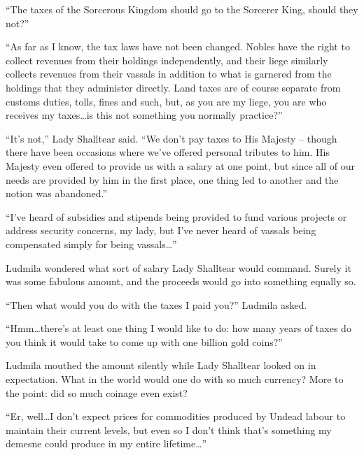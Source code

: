 

“The taxes of the Sorcerous Kingdom should go to the Sorcerer King, should they not?”

 

“As far as I know, the tax laws have not been changed. Nobles have the right to collect revenues from their holdings independently, and their liege similarly collects revenues from their vassals in addition to what is garnered from the holdings that they administer directly. Land taxes are of course separate from customs duties, tolls, fines and such, but, as you are my liege, you are who receives my taxes…is this not something you normally practice?”

 

“It’s not,” Lady Shalltear said. “We don’t pay taxes to His Majesty – though there have been occasions where we’ve offered personal tributes to him. His Majesty even offered to provide us with a salary at one point, but since all of our needs are provided by him in the first place, one thing led to another and the notion was abandoned.”

 

“I’ve heard of subsidies and stipends being provided to fund various projects or address security concerns, my lady, but I’ve never heard of vassals being compensated simply for being vassals…”

 

Ludmila wondered what sort of salary Lady Shalltear would command. Surely it was some fabulous amount, and the proceeds would go into something equally so.

 

“Then what would you do with the taxes I paid you?” Ludmila asked.

 

“Hmm…there’s at least one thing I would like to do: how many years of taxes do you think it would take to come up with one billion gold coins?”

 

Ludmila mouthed the amount silently while Lady Shalltear looked on in expectation. What in the world would one do with so much currency? More to the point: did so much coinage even exist?

 

“Er, well…I don’t expect prices for commodities produced by Undead labour to maintain their current levels, but even so I don’t think that’s something my demesne could produce in my entire lifetime…”

 

